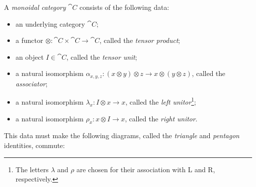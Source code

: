 \begin{dfn}\label{def:monoidal category}
  A \emph{monoidal category} $\cat{C}$ consists of the following data:
  \begin{itemize}
    \item an underlying category $\cat{C}$;
    \item a functor $\otimes: \cat{C}\times\cat{C}\to\cat{C}$, called the
      \emph{tensor product};
    \item an object $I\in\cat{C}$, called the \emph{tensor unit};
    \item a natural isomorphism $\alpha_{x,y,z}: (x\otimes y)\otimes z\to
      x\otimes(y\otimes z)$, called the \emph{associator};
    \item a natural isomorphism $\lambda_x: I\otimes x\to x$, called the
      \emph{left unitor}\footnote{The letters $\lambda$ and $\rho$ are chosen
      for their association with L and R, respectively.};
    \item a natural isomorphism $\rho_x: x\otimes I\to x$, called the
      \emph{right unitor}.
  \end{itemize}

  This data must make the following diagrams, called the \emph{triangle} and
  \emph{pentagon} identities, commute:
	\begin{figure}[H]
		\centering
	\end{figure}
\end{dfn}

